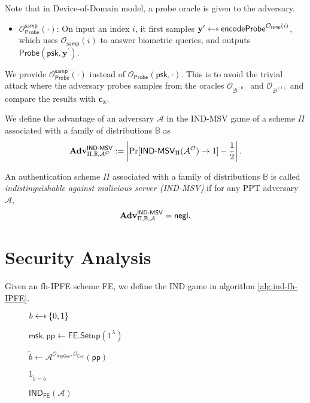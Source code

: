 Note that in Device-of-Domain model, a probe oracle is given to the adversary.

\begin{itemize}

	\item $\mathcal{O}_{\textsf{Probe}}^{\textsf{samp}}(\cdot)$: On input an index $i$, it first samples $\mathbf{y}^\prime \getsdollar \textsf{encodeProbe}^{\mathcal{O}_{\textsf{samp}}(i)}$, which uses $\mathcal{O}_{\textsf{samp}}(i)$ to answer biometric queries, and outputs $\textsf{Probe}(\textsf{psk}, \mathbf{y}^\prime )$. 

\end{itemize}

We provide $\mathcal{O}_{\textsf{Probe}}^{\textsf{samp}}(\cdot)$ instead of $\mathcal{O}_{\textsf{Probe}}(\textsf{psk}, \cdot)$. This is to avoid the trivial attack where the adversary probes samples from the oracles $\mathcal{O}_{\mathcal{B}^{(0)}}$ and $\mathcal{O}_{\mathcal{B}^{(1)}}$ and compare the results with $\mathbf{c_x}$.

We define the advantage of an adversary $\mathcal{A}$ in the \textsf{IND-MSV} game of a scheme $\Pi$ associated with a family of distributions $\mathbb{B}$ as
\[
	\mathbf{Adv}^{\textsf{IND-MSV}}_{\Pi, \mathbb{B}, \mathcal{A}^\mathcal{O}} := \left |\Pr[\textsf{IND-MSV}_{\Pi}(\mathcal{A}^\mathcal{O}) \to 1] - \frac{1}{2} \right|.
\]

An authentication scheme $\Pi$ associated with a family of distributions $\mathbb{B}$ is called \emph{indistinguishable against malicious server (IND-MSV)} if for any PPT adversary $\mathcal{A}$,
\[
	\mathbf{Adv}^{\textsf{IND-MSV}}_{\Pi, \mathbb{B}, \mathcal{A}} = \mathsf{negl}.
\]



\section{Security Analysis}
\label{sec:security_analysis}

Given an fh-IPFE scheme \textsf{FE}, we define the \textsf{IND} game in algorithm \ref{alg:ind-fh-IPFE}.

\begin{figure}[h]
\centering

	\begin{minipage}[t]{0.4\textwidth}
	\begin{algorithm}[H]
	\caption{$\textsf{IND}_{\textsf{FE}}(\mathcal{A})$}
	\label{alg:ind-fh-IPFE}
	\begin{algorithmic}[1]
		\State $b \getsdollar \{0, 1\}$

		\State $\textsf{msk}, \textsf{pp} \gets \textsf{FE.Setup}(1^\lambda)$

		\State $\tilde{b} \gets \mathcal{A}^{\mathcal{O}_{\textsf{KeyGen}}, \mathcal{O}_{\textsf{Enc}}} ( \textsf{pp} )$

		\State \Return $1_{\tilde{b} = b}$
	\end{algorithmic}
	\end{algorithm}
	\end{minipage}

\label{fig:ind-fh-IPFE}
\end{figure}

